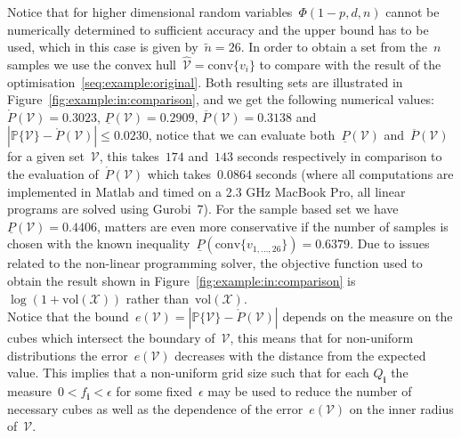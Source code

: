 \documentclass[letterpaper, 10pt, conference]{ieeeconf} %
\providecommand{\abs}[1]{\left\lvert#1\right\rvert}
\providecommand{\conv}{\text{conv}}
\providecommand{\bfa}[1]{\mathbf{#1}}
\begin{document}
%
Notice that for higher dimensional random variables~$\Phi(1-p,d,n)$ cannot be numerically determined to sufficient accuracy and the upper bound has to be used, which in this case is given by~$\tilde n=26$.
%
In order to obtain a set from the~$n$ samples we use the convex hull~$\hat{\mathcal V}=\conv\{v_i\}$ to compare with the result of the optimisation~\eqref{seq:example:original}.
%
Both resulting sets are illustrated in Figure~\ref{fig:example:in:comparison}, and we get the following numerical values: $\mathring{P}(\mathcal V) = 0.3023$, $\underline{P}(\mathcal V) = 0.2909$, $\overline{P}(\mathcal V)=0.3138$ and $\abs{\mathbb P\{\mathcal V\}-\mathring{P}(\mathcal V)}\leq 0.0230$, notice that we can evaluate both~$\underline{P}(\mathcal V)$ and~$\overline{P}(\mathcal V)$ for a given set~$\mathcal V$, this takes~$174$ and~$143$ seconds respectively in comparison to the evaluation of~$\mathring{P}(\mathcal V)$ which takes~$0.0864$ seconds (where all computations are implemented in Matlab and timed on a 2.3 GHz MacBook Pro, all linear programs are solved using Gurobi~7).
%
For the sample based set we have~$\underline{P}(\mathcal V)=0.4406$, matters are even more conservative if the number of samples is chosen with the known inequality~$\underline{P}(\conv\{v_{1,\dots,26}\})=0.6379$.
%
Due to issues related to the non-linear programming solver, the objective function used to obtain the result shown in Figure~\ref{fig:example:in:comparison} is~$\log(1+\text{vol}(\mathcal X))$ rather than~$\text{vol}(\mathcal X)$.
%
\\[1em]
%
Notice that the bound~$e(\mathcal V) = \abs{\mathbb P\{\mathcal V\}-\mathring{P}(\mathcal V)}$ depends on the measure on the cubes which intersect the boundary of~$\mathcal V$, this means that for non-uniform distributions the error~$e(\mathcal V)$ decreases with the distance from the expected value.
%
This implies that a non-uniform grid size such that for each $Q_\bfa{i}$ the measure~$0<f_\bfa{i}<\epsilon$ for some fixed~$\epsilon$ may be used to reduce the number of necessary cubes as well as the dependence of the error~$e(\mathcal V)$ on the inner radius of~$\mathcal V$.
\end{document}
